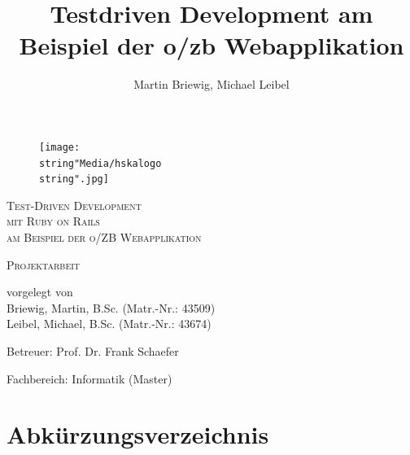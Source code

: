 \documentclass[12pt,             %
               a4paper,          %
               listof=totoc,     %
               index=totoc,      %
               bibliography=totoc,%
               oneside,         %
               BCOR1cm,          %
               english   %
               ]{scrbook}
\title{Testdriven Development am Beispiel der o/zb Webapplikation}
\author{Martin Briewig, Michael Leibel}
\begin{document}
\pagestyle{empty}
\begin{center}

\begin{figure}[h]
	\begin{center}
		\texttt{[image: \\string"Media/hskalogo\\string".jpg]}
	\end{center}
	\label{fig:hska_logo}
\end{figure} 

\vspace{5\baselineskip}

\textsc{\Huge Test-Driven Development\\ mit Ruby on Rails}\\[0.25cm]
\textsc{\large am Beispiel der o/ZB Webapplikation}\\[1.5cm]


\vspace{2\baselineskip}

\textsc{\LARGE Projektarbeit}\\[1.5cm]


\vspace{5\baselineskip}

vorgelegt von\\
Briewig, Martin, B.Sc. (Matr.-Nr.: 43509)\\
Leibel, Michael, B.Sc. (Matr.-Nr.: 43674)

\vspace{\baselineskip}

Betreuer: Prof. Dr. Frank Schaefer

Fachbereich: Informatik (Master)
\end{center}

\clearpage{}


\tableofcontents{}

\clearpage{}

\chapter*{Abkürzungsverzeichnis}

\begin{acronym}[SQL]
\end{acronym}

\newpage
\end{document}
